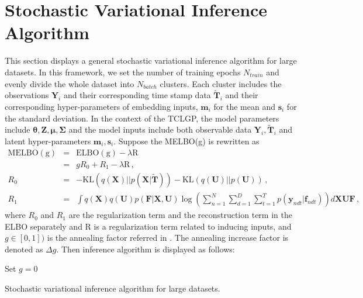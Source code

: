 \section{Stochastic Variational Inference Algorithm}
\label{sec: scia}
This section displays a general stochastic variational inference algorithm for large datasets. In this framework, we set the number of training epochs $N_{train}$ and evenly divide the whole dataset into $N_{batch}$ clusters. Each cluster includes the observations $\bm Y_i$ and their corresponding time stamp data $\tilde{\bm T}_i$ and their corresponding hyper-parameters of embedding inputs, $\bm m_i$ for the mean and $\bm s_i$ for the standard deviation. In the context of the TCLGP, the model parameters include $\bm \theta, \bm Z, \bm \mu, \bm \Sigma$ and the model inputs include both observable data $\bm Y_i, \tilde{\bm T}_i$ and latent hyper-parameters $\bm m_i, \bm s_i$. Suppose the MELBO(g) is rewritten as
\begin{eqnarray}
\mathrm{MELBO(g)} & = & \mathrm{ELBO(g)} - \lambda\mathrm{R} \nonumber \\
& = & gR_0 + R_1 - \lambda\mathrm{R}\,, \nonumber \\
R_0 & = & -\mathrm{KL}(q(\bm X) || p(\bm X | \tilde{\bm T})) - \mathrm{KL}(q(\bm U) || p(\bm U)) \,, \nonumber \\
R_1 & = & \int q(\bm X) q(\bm  U) p(\bm F | \bm X, \bm U) \log\left(\sum_{n = 1}^{N}\sum_{d = 1}^{D}\sum_{t = 1}^{T} p(\bm y_{ndt} | \bm f_{ndt})\right)d\bm X \bm U \bm F \,, \nonumber
\end{eqnarray}
where $R_0$ and $R_1$ are the regularization term and the reconstruction term 
in the ELBO separately and $\mathrm{R}$ is a regularization term related to inducing inputs, and $g\in[0,1])$ is the annealing factor referred in \cite{Bowman_2015}. The annealing increase factor is denoted as $\Delta g$. Then inference algorithm is displayed as follows: 

\begin{algorithm}[H]
	\SetAlgoLined
	Set $g = 0$\;
	\caption{Stochastic variational inference algorithm for large datasets.}
\end{algorithm}

